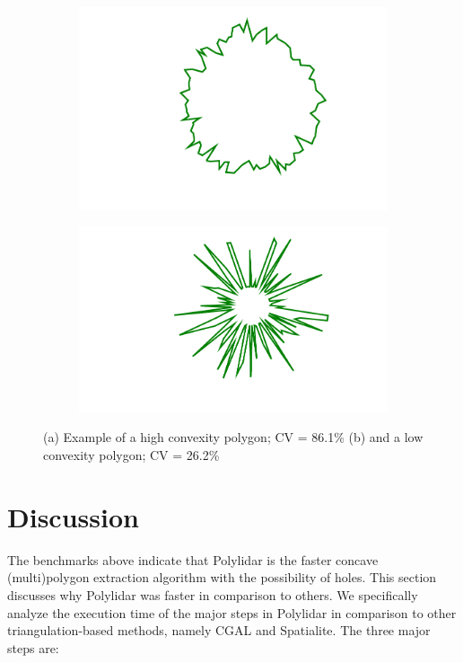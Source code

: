 \begin{figure}[ht]
    \centering
  \begin{subfigure}[t]{.25\linewidth}
    \centering
    \includegraphics[width=0.99\linewidth]{chapter_2_polylidar/imgs/hi_convexity.pdf}
    \caption{}
    \label{fig:ch2_hi_convexity}
  \end{subfigure}
  \begin{subfigure}[t]{.26\linewidth}
    \centering
     \includegraphics[width=.99\linewidth]{chapter_2_polylidar/imgs/low_convexity.pdf}
    \caption{}
    \label{fig:ch2_low_convexity}
  \end{subfigure}
  \caption[Example of high and low convexity polygons]{(a) Example of a high convexity polygon; CV = 86.1\% (b)  and a low convexity polygon; CV = 26.2\%}
  \label{fig:ch2_convexity} 
\end{figure}


\section{Discussion}\label{sec:ch2_discussion}
The benchmarks above indicate that Polylidar is the faster concave (multi)polygon extraction algorithm with the possibility of holes. This section discusses why Polylidar was faster in comparison to others. We specifically analyze the execution time of the major steps in Polylidar in comparison to other triangulation-based methods, namely CGAL and Spatialite. The three major steps are:

